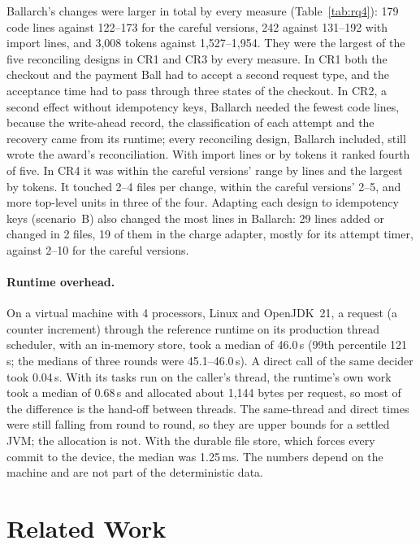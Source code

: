 \documentclass[11pt]{article}
\theoremstyle{definition}
\theoremstyle{plain}
\begin{document}
Ballarch's changes were larger in total by every measure (Table~\ref{tab:rq4}): 179 code lines against 122--173 for the careful versions, 242 against 131--192 with import lines, and 3{,}008 tokens against 1{,}527--1{,}954. They were the largest of the five reconciling designs in CR1 and CR3 by every measure. In CR1 both the checkout and the payment Ball had to accept a second request type, and the acceptance time had to pass through three states of the checkout. In CR2, a second effect without idempotency keys, Ballarch needed the fewest code lines, because the write-ahead record, the classification of each attempt and the recovery came from its runtime; every reconciling design, Ballarch included, still wrote the award's reconciliation. With import lines or by tokens it ranked fourth of five. In CR4 it was within the careful versions' range by lines and the largest by tokens. It touched 2--4 files per change, within the careful versions' 2--5, and more top-level units in three of the four. Adapting each design to idempotency keys (scenario~B) also changed the most lines in Ballarch: 29 lines added or changed in 2 files, 19 of them in the charge adapter, mostly for its attempt timer, against 2--10 for the careful versions.

\paragraph{Runtime overhead.} On a virtual machine with 4 processors, Linux and OpenJDK~21, a request (a counter increment) through the reference runtime on its production thread scheduler, with an in-memory store, took a median of 46.0\,\textmu s (99th percentile 121\,\textmu s; the medians of three rounds were 45.1--46.0\,\textmu s). A direct call of the same decider took 0.04\,\textmu s. With its tasks run on the caller's thread, the runtime's own work took a median of 0.68\,\textmu s and allocated about 1{,}144 bytes per request, so most of the difference is the hand-off between threads. The same-thread and direct times were still falling from round to round, so they are upper bounds for a settled JVM; the allocation is not. With the durable file store, which forces every commit to the device, the median was 1.25\,ms. The numbers depend on the machine and are not part of the deterministic data.

\section{Related Work}
\label{sec:related}
\end{document}
